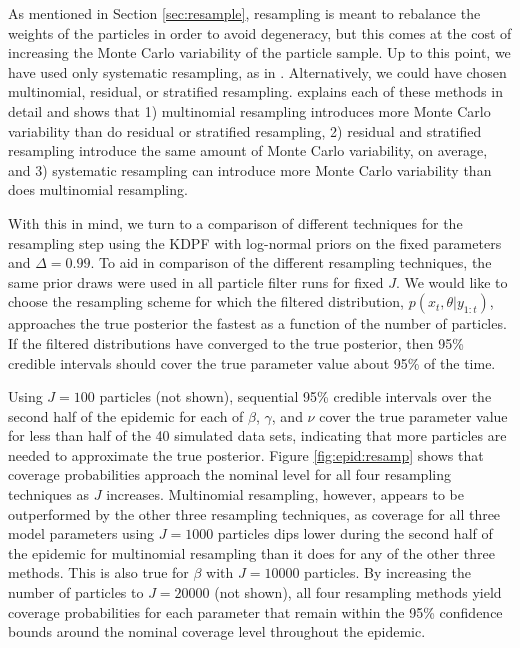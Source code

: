 As mentioned in Section \ref{sec:resample}, resampling is meant to rebalance the weights of the particles in order to avoid degeneracy, but this comes at the cost of increasing the Monte Carlo variability of the particle sample. Up to this point, we have used only systematic resampling, as in \citet{skvortsov2012monitoring}. Alternatively, we could have chosen multinomial, residual, or stratified resampling. \citet{Douc:Capp:Moul:comp:2005} explains each of these methods in detail and shows that 1) multinomial resampling introduces more Monte Carlo variability than do residual or stratified resampling, 2) residual and stratified resampling introduce the same amount of Monte Carlo variability, on average, and 3) systematic resampling can introduce more Monte Carlo variability than does multinomial resampling.

With this in mind, we turn to a comparison of different techniques for the resampling step using the KDPF with log-normal priors on the fixed parameters and $\Delta = 0.99$. To aid in comparison of the different resampling techniques, the same prior draws were used in all particle filter runs for fixed $J$. We would like to choose the resampling scheme for which the filtered distribution, $p(x_t,\theta|y_{1:t})$, approaches the true posterior the fastest as a function of the number of particles. If the filtered distributions have converged to the true posterior, then 95\% credible intervals should cover the true parameter value about 95\% of the time.

Using $J = 100$ particles (not shown), sequential 95\% credible intervals over the second half of the epidemic for each of $\beta$, $\gamma$, and $\nu$ cover the true parameter value for less than half of the 40 simulated data sets, indicating that more particles are needed to approximate the true posterior. Figure \ref{fig:epid:resamp} shows that coverage probabilities approach the nominal level for all four resampling techniques as $J$ increases. Multinomial resampling, however, appears to be outperformed by the other three resampling techniques, as coverage for all three model parameters using $J = 1000$ particles dips lower during the second half of the epidemic for multinomial resampling than it does for any of the other three methods. This is also true for $\beta$ with $J = 10000$ particles. By increasing the number of particles to $J = 20000$ (not shown), all four resampling methods yield coverage probabilities for each parameter that remain within the 95\% confidence bounds around the nominal coverage level throughout the epidemic.

